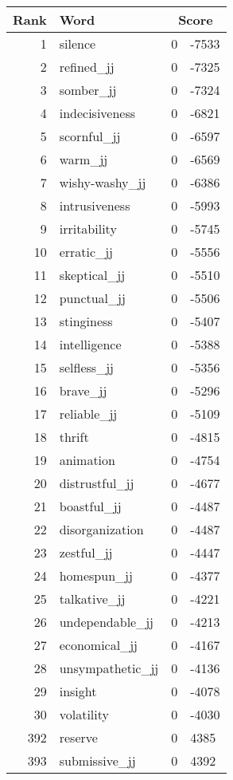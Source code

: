 \begin{longtable}[!htbp]{| rlr@{.}l |}
    \hline
    \textbf{Rank} & \textbf{Word} & \multicolumn{2}{c|}{\textbf{Score}} \\
    \hline
    \endhead
    1 & silence & 0 & -7533 \\
    2 & refined\_jj & 0 & -7325 \\
    3 & somber\_jj & 0 & -7324 \\
    4 & indecisiveness & 0 & -6821 \\
    5 & scornful\_jj & 0 & -6597 \\
    6 & warm\_jj & 0 & -6569 \\
    7 & wishy-washy\_jj & 0 & -6386 \\
    8 & intrusiveness & 0 & -5993 \\
    9 & irritability & 0 & -5745 \\
    10 & erratic\_jj & 0 & -5556 \\
    11 & skeptical\_jj & 0 & -5510 \\
    12 & punctual\_jj & 0 & -5506 \\
    13 & stinginess & 0 & -5407 \\
    14 & intelligence & 0 & -5388 \\
    15 & selfless\_jj & 0 & -5356 \\
    16 & brave\_jj & 0 & -5296 \\
    17 & reliable\_jj & 0 & -5109 \\
    18 & thrift & 0 & -4815 \\
    19 & animation & 0 & -4754 \\
    20 & distrustful\_jj & 0 & -4677 \\
    21 & boastful\_jj & 0 & -4487 \\
    22 & disorganization & 0 & -4487 \\
    23 & zestful\_jj & 0 & -4447 \\
    24 & homespun\_jj & 0 & -4377 \\
    25 & talkative\_jj & 0 & -4221 \\
    26 & undependable\_jj & 0 & -4213 \\
    27 & economical\_jj & 0 & -4167 \\
    28 & unsympathetic\_jj & 0 & -4136 \\
    29 & insight & 0 & -4078 \\
    30 & volatility & 0 & -4030 \\
    392 & reserve & 0 & 4385 \\
    393 & submissive\_jj & 0 & 4392 \\

\end{longtable}

